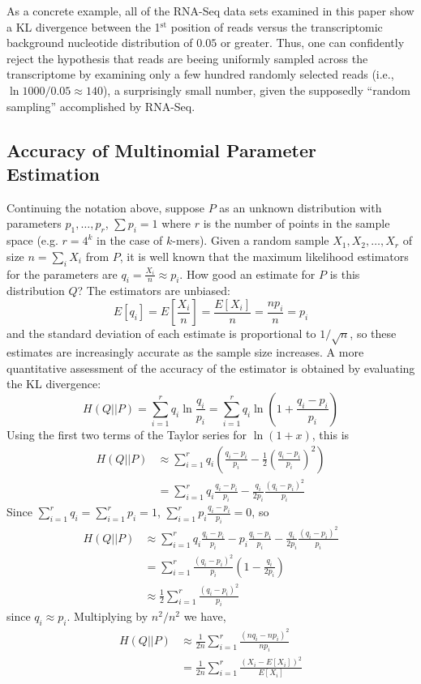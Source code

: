\documentclass[letterpaper]{article}
\begin{document}
As a concrete example, all of the RNA-Seq data sets examined in this paper show
a KL divergence between the 1$^{\text{st}}$ position of reads versus the
transcriptomic background nucleotide distribution of $0.05$ or greater. Thus,
one can confidently reject the hypothesis that reads are beeing uniformly
sampled across the transcriptome by examining only a few hundred randomly
selected reads (i.e., $\ln 1000 / 0.05 \approx 140$), a surprisingly small
number, given the supposedly ``random sampling'' accomplished by RNA-Seq.


\subsection{Accuracy of Multinomial Parameter Estimation}

Continuing the notation above, suppose $P$ as an unknown distribution with
parameters $p_1, \dots, p_r$, $\sum p_i = 1$ where $r$ is the number of points
in the sample space (e.g. $r = 4^{k}$ in the case of $k$-mers). Given a random
sample $X_1, X_2, \dots, X_r$ of size $n = \sum_{i} X_i$ from $P$, it is well
known that the maximum likelihood estimators for the parameters are $q_i =
\frac{X_i}{n} \approx p_i$. How good an estimate for $P$ is this distribution
$Q$? The estimators are unbiased:
$$E[q_i] = E\left[\frac{X_i}{n}\right] = \frac{E[X_i]}{n} = \frac{np_i}{n} =
p_i$$
and the standard deviation of each estimate is proportional to $1/\sqrt{n}$, so
these estimates are increasingly accurate as the sample size increases. A more
quantitative assessment of the accuracy of the estimator is obtained by
evaluating the KL divergence:
$$H(Q||P)
= \sum_{i = 1}^{r} q_i \ln \frac{q_i}{p_i}
= \sum_{i = 1}^{r} q_i \ln \left(1 + \frac{q_i - p_i}{p_i} \right) $$
Using the first two terms of the Taylor series for $\ln (1 + x)$, this is
\begin{align*}
H(Q||P) &\approx \sum_{i = 1}^{r} q_i \left( \frac{q_i - p_i}{p_i} -
\frac{1}{2} \left( \frac{q_i - p_i}{p_i} \right)^2 \right ) \\
&= \sum_{i = 1}^{r} q_i \frac{q_i - p_i}{p_i} -
\frac{q_i}{2 p_i} \frac{(q_i - p_i)^2} {p_i}
\end{align*}
Since $\sum_{i = 1}^{r} q_i = \sum_{i = 1}^{r} p_i = 1$,
$\sum_{i = 1}^{r} p_i \frac{q_i - p_i}{p_i} = 0$, so
\begin{align*}
H(Q||P) &\approx \sum_{i=1}^{r} q_i \frac{q_i - p_i}{p_i} - p_i \frac{q_i -
p_i}{p_i} - \frac{q_i}{2 p_i} \frac{(q_i - p_i)^2}{p_i} \\
&= \sum_{i=1}^{r} \frac{(q_i - p_i)^2}{p_i}\left(1 - \frac{q_i}{2 p_i}\right) \\
&\approx \frac{1}{2} \sum_{i=1}^{r} \frac{(q_i - p_i)^2}{p_i}
\end{align*}
since $q_i \approx p_i$. Multiplying by $n^2 / n^2$ we have,
\begin{align*}
H(Q||P) &\approx \frac{1}{2n} \sum_{i=1}^{r} \frac{(n q_i - n p_i)^2}{n p_i} \\
        &= \frac{1}{2n} \sum_{i=1}^{r} \frac{(X_i - E[X_i])^2}{E[X_i]}
\end{align*}
\end{document}

